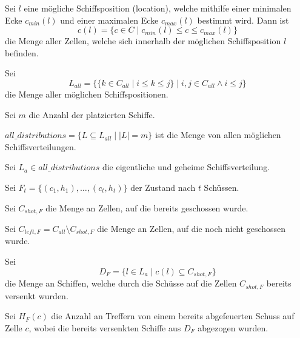 \documentclass[a4paper,12pt]{llncs}
\numberwithin{equation}{section}
\begin{document}
\begin{definition}
Sei $l$ eine mögliche Schiffsposition (location), welche mithilfe einer minimalen Ecke $c_{min}(l)$ und einer maximalen Ecke $c_{max}(l)$ bestimmt wird. Dann ist
\[
c(l)=
\{
c
\in
C
\mid
c_{min}(l) \leq c \leq c_{max}(l)
\}
\]
die Menge aller Zellen, welche sich innerhalb der möglichen Schiffsposition $l$ befinden.
\end{definition}

\begin{definition}
Sei 
\[
L_{all}=
\{
\{
k
\in
C_{all}
\mid
i \leq k \leq j
\}
\mid
i,j \in C_{all}
\wedge
i \leq j
\}
\] die Menge aller möglichen Schiffspositionen.
\end{definition}

\begin{definition}
Sei $m$ die Anzahl der platzierten Schiffe.
\end{definition}

\begin{definition}
$all\_distributions=\{L \subseteq L_{all} \mid |L|=m\}$ ist die Menge von allen möglichen Schiffsverteilungen.
\end{definition}

\begin{definition}
Sei $L_a \in all\_distributions$ die eigentliche und geheime Schiffsverteilung.
\end{definition}

\begin{definition}
Sei $F_t=\{(c_1, h_1), \dots , (c_t, h_t)\}$ der Zustand nach $t$ Schüssen.
\end{definition}

\begin{definition}
Sei $C_{shot,F}$ die Menge an Zellen, auf die bereits geschossen wurde.
\end{definition}

\begin{definition}
Sei $C_{left,F}=C_{all} \setminus C_{shot,F}$ die Menge an Zellen, auf die noch nicht geschossen wurde.
\end{definition}

\begin{definition}
Sei
\[
D_F=\{l \in L_a \mid c(l) \subseteq C_{shot,F}\}
\]
die Menge an Schiffen, welche durch die Schüsse auf die Zellen $C_{shot,F}$ bereits versenkt wurden.
\end{definition}

\begin{definition}
Sei $H_F(c)$ die Anzahl an Treffern von einem bereits abgefeuerten Schuss auf Zelle $c$, wobei die bereits versenkten Schiffe aus $D_F$ abgezogen wurden.
\end{definition}
\end{document}
